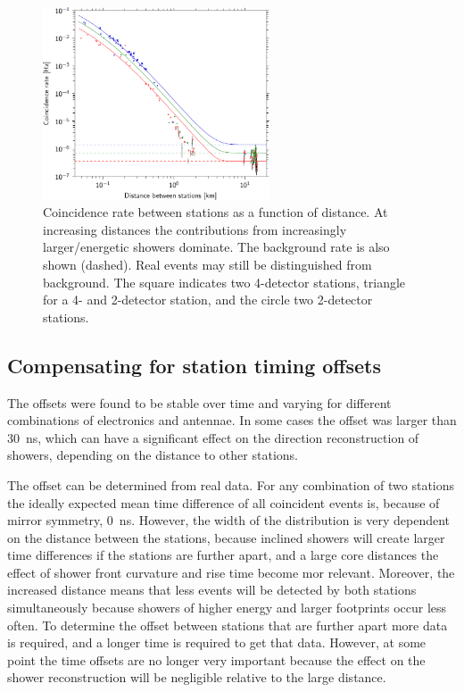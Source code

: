 \begin{figure}
    \centering
    \includegraphics[width=0.6\textwidth]
                    {plots/cluster/distance_v_coincidence_rate}
    \caption{Coincidence rate between stations as a function of distance. At increasing distances the contributions from increasingly larger/energetic showers dominate. The background rate is also shown (dashed). Real events may still be distinguished from background. The square indicates two 4-detector stations, triangle for a 4- and 2-detector station, and the circle two 2-detector stations.}
    \label{fig:distance_v_coincidence_rate}
\end{figure}


\subsection{Compensating for station timing offsets}

The offsets were found to be stable over time and varying for different combinations of \hisparc electronics and \gps antennae. In some cases the offset was larger than \SI{30}{\ns}, which can have a significant effect on the direction reconstruction of showers, depending on the distance to other stations.

The offset can be determined from real data. For any combination of two stations the ideally expected mean time difference of all coincident events is, because of mirror symmetry, \SI{0}{\ns}. However, the width of the distribution is very dependent on the distance between the stations, because inclined showers will create larger time differences if the stations are further apart, and a large core distances the effect of shower front curvature and rise time become mor relevant. Moreover, the increased distance means that less events will be detected by both stations simultaneously because showers of higher energy and larger footprints occur less often. To determine the offset between stations that are further apart more data is required, and a longer time is required to get that data. However, at some point the time offsets are no longer very important because the effect on the shower reconstruction will be negligible relative to the large distance.


